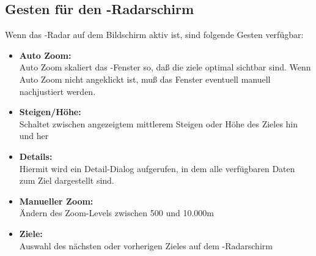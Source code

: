 \subsection*{Gesten für den \fl-Radarschirm}
Wenn das \fl-Radar auf dem Bildschirm aktiv ist, sind folgende Gesten verfügbar: 

\begin{itemize}\itemsep1.25em
\item[] \textbf{Auto Zoom:}\\  Auto Zoom skaliert das \fl-Fenster so, daß die ziele optimal sichtbar sind. Wenn Auto Zoom nicht angeklickt ist, muß das Fenster eventuell manuell nachjustiert werden. 
\item[] \textbf{Steigen/Höhe:}\\ Schaltet zwischen angezeigtem mittlerem Steigen oder Höhe des Zieles hin und her
\item[] \textbf{Details:}\\ Hiermit wird ein Detail-Dialog  aufgerufen, in dem alle verfügbaren Daten zum Ziel dargestellt sind.  
\item[] \textbf{Manueller Zoom:}\\ Ändern des Zoom-Levels zwischen 500 und 10.000m
\item[] \textbf{Ziele:}\\ Auswahl des nächsten oder vorherigen Zieles auf dem \fl-Radarschirm
\end{itemize}
